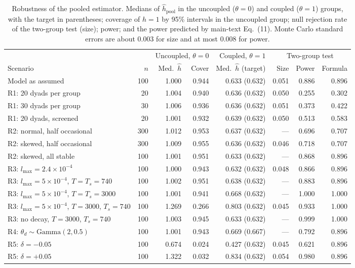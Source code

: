 \documentclass[12pt]{article}
\theoremstyle{definition}
\begin{document}
\begin{table}[H]
\centering\footnotesize
\caption{Robustness of the pooled estimator. Medians of $\hat h_{\mathrm{pool}}$ in
the uncoupled ($\theta=0$) and coupled ($\theta=1$) groups, with the target in
parentheses; coverage of $h=1$ by 95\% intervals in the uncoupled group; null
rejection rate of the two-group test (size); power; and the power predicted by
main-text Eq.~(11). Monte Carlo standard errors are about 0.003 for
size and at most 0.008 for power.}\label{tab:robust}
\setlength{\tabcolsep}{3.5pt}
\begin{tabular}{@{}lrrrrrrr@{}}
\toprule
& & \multicolumn{2}{c}{Uncoupled, $\theta=0$} & Coupled, $\theta=1$ & \multicolumn{3}{c}{Two-group test}\\
\cmidrule(lr){3-4}\cmidrule(lr){5-5}\cmidrule(l){6-8}
Scenario & $n$ & Med.\ $\hat h$ & Cover & Med.\ $\hat h$ (target) & Size & Power & Formula\\
\midrule
Model as assumed & 100 & 1.000 & 0.944 & 0.633 (0.632) & 0.051 & 0.886 & 0.896\\
R1: 20 dyads per group & 20 & 1.004 & 0.940 & 0.636 (0.632) & 0.050 & 0.255 & 0.302\\
R1: 30 dyads per group & 30 & 1.006 & 0.936 & 0.636 (0.632) & 0.051 & 0.373 & 0.422\\
R1: 20 dyads, screened & 20 & 1.001 & 0.932 & 0.639 (0.632) & 0.050 & 0.513 & 0.583\\
R2: normal, half occasional & 300 & 1.012 & 0.953 & 0.637 (0.632) & --- & 0.696 & 0.707\\
R2: skewed, half occasional & 300 & 1.009 & 0.955 & 0.636 (0.632) & 0.046 & 0.718 & 0.707\\
R2: skewed, all stable & 100 & 1.001 & 0.951 & 0.633 (0.632) & --- & 0.868 & 0.896\\
R3: $l_{\max}=2.4\times10^{-4}$ & 100 & 1.000 & 0.943 & 0.632 (0.632) & 0.048 & 0.866 & 0.896\\
R3: $l_{\max}=5\times10^{-4}$, $T=T_s=740$ & 100 & 1.002 & 0.951 & 0.638 (0.632) & --- & 0.883 & 0.896\\
R3: $l_{\max}=5\times10^{-4}$, $T=T_s=3000$ & 100 & 1.001 & 0.941 & 0.668 (0.632) & --- & 1.000 & 1.000\\
R3: $l_{\max}=5\times10^{-4}$, $T=3000$, $T_s=740$ & 100 & 1.269 & 0.266 & 0.803 (0.632) & 0.045 & 0.933 & 1.000\\
R3: no decay, $T=3000$, $T_s=740$ & 100 & 1.003 & 0.945 & 0.633 (0.632) & --- & 0.999 & 1.000\\
R4: $\theta_d\sim\mathrm{Gamma}(2,0.5)$ & 100 & 1.001 & 0.943 & 0.669 (0.667) & --- & 0.792 & 0.896\\
R5: $\delta=-0.05$ & 100 & 0.674 & 0.024 & 0.427 (0.632) & 0.045 & 0.621 & 0.896\\
R5: $\delta=+0.05$ & 100 & 1.322 & 0.032 & 0.834 (0.632) & 0.054 & 0.980 & 0.896\\
\bottomrule
\end{tabular}
\end{table}
\end{document}
